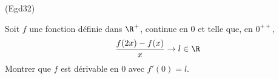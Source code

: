 \begin{tiny}(Egd32)\end{tiny} Soit $f$ une fonction définie dans $\R^+$, continue en $0$ et telle que, en $0^{++}$,
\begin{displaymath}
 \frac{f(2x)-f(x)}{x}\rightarrow l\in \R
\end{displaymath}
 Montrer que $f$ est dérivable en $0$ avec $f'(0)=l$.